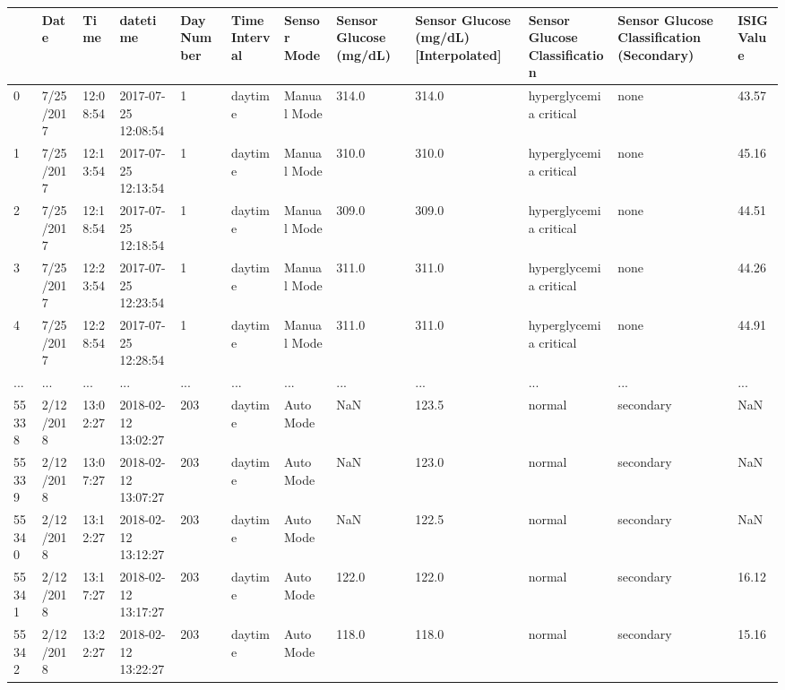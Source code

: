 \begin{tabular}{p{}p{}p{}p{}p{}p{}p{}p{}p{}p{}p{}p{}}
\toprule
 & Date & Time & datetime & Day Number & Time Interval & Sensor Mode & Sensor Glucose (mg/dL) & Sensor Glucose (mg/dL) [Interpolated] & Sensor Glucose Classification & Sensor Glucose Classification (Secondary) & ISIG Value \\
\hline
0 & 7/25/2017 & 12:08:54 & 2017-07-25 12:08:54 & 1 & daytime & Manual Mode & 314.0 & 314.0 & hyperglycemia critical & none & 43.57 \\
\hline
1 & 7/25/2017 & 12:13:54 & 2017-07-25 12:13:54 & 1 & daytime & Manual Mode & 310.0 & 310.0 & hyperglycemia critical & none & 45.16 \\
\hline
2 & 7/25/2017 & 12:18:54 & 2017-07-25 12:18:54 & 1 & daytime & Manual Mode & 309.0 & 309.0 & hyperglycemia critical & none & 44.51 \\
\hline
3 & 7/25/2017 & 12:23:54 & 2017-07-25 12:23:54 & 1 & daytime & Manual Mode & 311.0 & 311.0 & hyperglycemia critical & none & 44.26 \\
\hline
4 & 7/25/2017 & 12:28:54 & 2017-07-25 12:28:54 & 1 & daytime & Manual Mode & 311.0 & 311.0 & hyperglycemia critical & none & 44.91 \\
\hline
... & ... & ... & ... & ... & ... & ... & ... & ... & ... & ... & ... \\
\hline
55338 & 2/12/2018 & 13:02:27 & 2018-02-12 13:02:27 & 203 & daytime & Auto Mode & NaN & 123.5 & normal & secondary & NaN \\
\hline
55339 & 2/12/2018 & 13:07:27 & 2018-02-12 13:07:27 & 203 & daytime & Auto Mode & NaN & 123.0 & normal & secondary & NaN \\
\hline
55340 & 2/12/2018 & 13:12:27 & 2018-02-12 13:12:27 & 203 & daytime & Auto Mode & NaN & 122.5 & normal & secondary & NaN \\
\hline
55341 & 2/12/2018 & 13:17:27 & 2018-02-12 13:17:27 & 203 & daytime & Auto Mode & 122.0 & 122.0 & normal & secondary & 16.12 \\
\hline
55342 & 2/12/2018 & 13:22:27 & 2018-02-12 13:22:27 & 203 & daytime & Auto Mode & 118.0 & 118.0 & normal & secondary & 15.16 \\
\hline
\bottomrule
\end{tabular}

